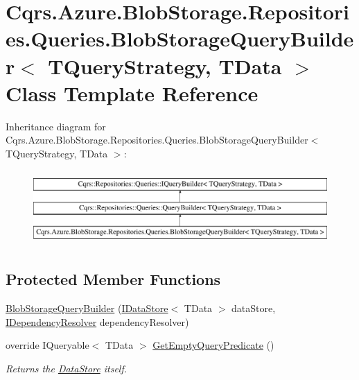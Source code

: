 \hypertarget{classCqrs_1_1Azure_1_1BlobStorage_1_1Repositories_1_1Queries_1_1BlobStorageQueryBuilder}{}\section{Cqrs.\+Azure.\+Blob\+Storage.\+Repositories.\+Queries.\+Blob\+Storage\+Query\+Builder$<$ T\+Query\+Strategy, T\+Data $>$ Class Template Reference}
\label{classCqrs_1_1Azure_1_1BlobStorage_1_1Repositories_1_1Queries_1_1BlobStorageQueryBuilder}
Inheritance diagram for Cqrs.\+Azure.\+Blob\+Storage.\+Repositories.\+Queries.\+Blob\+Storage\+Query\+Builder$<$ T\+Query\+Strategy, T\+Data $>$\+:\begin{figure}[H]
\begin{center}
\leavevmode
\includegraphics[height=2.876712cm]{classCqrs_1_1Azure_1_1BlobStorage_1_1Repositories_1_1Queries_1_1BlobStorageQueryBuilder}
\end{center}
\end{figure}
\subsection*{Protected Member Functions}
\begin{DoxyCompactItemize}
\item 
\hyperlink{classCqrs_1_1Azure_1_1BlobStorage_1_1Repositories_1_1Queries_1_1BlobStorageQueryBuilder_ae6519f289d2b7be9d322dfa7171dea8b_ae6519f289d2b7be9d322dfa7171dea8b}{Blob\+Storage\+Query\+Builder} (\hyperlink{interfaceCqrs_1_1DataStores_1_1IDataStore}{I\+Data\+Store}$<$ T\+Data $>$ data\+Store, \hyperlink{interfaceCqrs_1_1Configuration_1_1IDependencyResolver}{I\+Dependency\+Resolver} dependency\+Resolver)
\item 
override I\+Queryable$<$ T\+Data $>$ \hyperlink{classCqrs_1_1Azure_1_1BlobStorage_1_1Repositories_1_1Queries_1_1BlobStorageQueryBuilder_a5987844de032c5473714dafcee7f4ae1_a5987844de032c5473714dafcee7f4ae1}{Get\+Empty\+Query\+Predicate} ()
\begin{DoxyCompactList}\small\item\em Returns the \hyperlink{classCqrs_1_1Repositories_1_1Queries_1_1QueryBuilder_a8a64851b3bf82ed5d2e708cd39d71890_a8a64851b3bf82ed5d2e708cd39d71890}{Data\+Store} itself. \end{DoxyCompactList}\end{DoxyCompactItemize}
